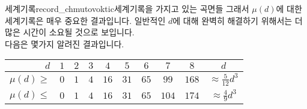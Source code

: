\begin{surferIntroPage}{세계기록}{record_chmutovoktic}{세계기록을 가지고 있는 곡면들}
그래서 $\mu(d)$에 대한 세계기록은 매우 중요한 결과입니다. 일반적인 $d$에 대해 완벽히 해결하기 위해서는 더 많은 시간이 소요될 것으로 보입니다. \\  다음은 몇가지 알려진 결과입니다.  
    
   \begin{center}
      \begin{tabular}{r|cccccccc|c}
        $d$ & $1$ & $2$ & $3$ & $4$ & $5$ & $6$ & $7$ & $8$ & $d$\\
        \hline
        \hline
        \rule{0pt}{1.2em}$\mu(d)\ge$ & $0$ & $1$ & $4$ & $16$ & $31$ & $65$ &
        $99$ & $168$ & 
        $\approx \frac{5}{12}d^3$\\[0.3em]
        \hline
        \rule{0pt}{1.2em}$\mu(d)\le$ & $0$ & $1$ & $4$ & $16$ & $31$ & $65$ &
        $104$ & $174$ & $\approx \frac{4}{9}d^3$
      \end{tabular}
    \end{center}
\end{surferIntroPage}
